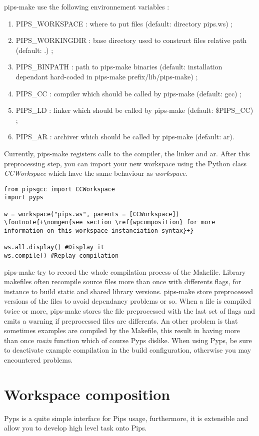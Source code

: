 \documentclass[a4paper]{article}
\begin{document}
pips-make use the following environnement variables :
\begin{enumerate}
  \item PIPS\_WORKSPACE : where to put files (default: directory pips.ws) ;
  \item PIPS\_WORKINGDIR : base directory used to construct files relative path (default: .) ;
  \item PIPS\_BINPATH : path to pips-make binaries (default: installation dependant hard-coded in pips-make prefix/lib/pips-make) ;
  \item PIPS\_CC : compiler which should be called by pips-make (default: gcc) ;
  \item PIPS\_LD : linker which should be called by pips-make (default: \$PIPS\_CC) ;
  \item PIPS\_AR : archiver which should be called by pips-make (default: ar).
\end{enumerate}

Currently, pips-make registers calls to the compiler, the linker and ar.
After this preprocessing step, you can import your new workspace using the Python class \emph{CCWorkspace} which have the same behaviour as \emph{workspace}.
\begin{lstlisting}
from pipsgcc import CCWorkspace
import pyps

w = workspace("pips.ws", parents = [CCWorkspace]) \footnote{+\nomgen{see section \ref{wpcomposition} for more information on this workspace instanciation syntax}+}

ws.all.display() #Display it
ws.compile() #Replay compilation
\end{lstlisting}

pips-make try to record the whole compilation process of the Makefile. Library makefiles often recompile source files more than once with differents flags, for instance to build static and shared library versions. pips-make store preprocessed versions of the files to avoid dependancy problems or so. When a file is compiled twice or more, pips-make stores the file preprocessed with the last set of flags and emits a warning if preprocessed files are differents. An other problem is that sometimes examples are compiled by the Makefile, this result in having more than once \emph{main} function which of course Pyps dislike. When using Pyps, be sure to deactivate example compilation in the build configuration, otherwise you may encountered problems.

\section{Workspace composition} \label{wpcomposition}
Pyps is a quite simple interface for Pips usage, furthermore, it is extensible and allow you to develop high level task onto Pips.
\end{document}
